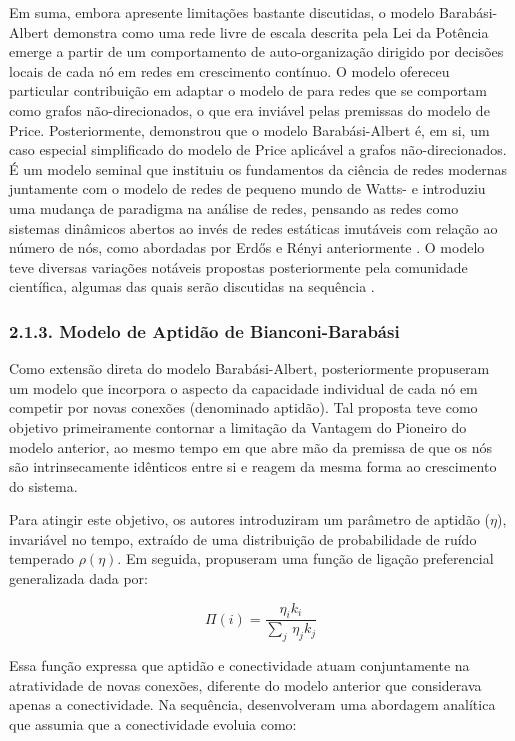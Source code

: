 \documentclass[12pt,oneside,a4paper,brazil,sumario=tradicional]{abntex2}
\begin{document}
Em suma, embora apresente limitações bastante discutidas, o modelo Barabási-Albert demonstra como uma rede livre de escala descrita pela Lei da Potência emerge a partir de um comportamento de auto-organização dirigido por decisões locais de cada nó em redes em crescimento contínuo. O modelo ofereceu particular contribuição em adaptar o modelo de \textcite{price1976} para redes que se comportam como grafos não-direcionados, o que era inviável pelas premissas do modelo de Price. Posteriormente, \textcite{newman2003} demonstrou que  o modelo Barabási-Albert é, em si, um caso especial simplificado do modelo de Price aplicável a grafos não-direcionados. É um modelo seminal que instituiu os fundamentos da ciência de redes modernas juntamente com o modelo de redes de pequeno mundo de Watts-\textcite{watts1998} e introduziu uma mudança de paradigma na análise de redes, pensando as redes como sistemas dinâmicos abertos ao invés de redes estáticas imutáveis com relação ao número de nós, como abordadas por Erdős e Rényi anteriormente \parencite{latora2017}. O modelo teve diversas variações notáveis propostas posteriormente pela comunidade científica, algumas das quais serão discutidas na sequência .

\subsubsection*{2.1.3. Modelo de Aptidão de Bianconi-Barabási}
Como extensão direta do modelo Barabási-Albert, posteriormente \textcite{bianconi2001} propuseram um modelo que incorpora o aspecto da capacidade individual de cada nó em competir por novas conexões (denominado aptidão). Tal proposta teve como objetivo primeiramente contornar a limitação da Vantagem do Pioneiro do modelo anterior, ao mesmo tempo em que abre mão da premissa de que os nós são intrinsecamente idênticos entre si e reagem da mesma forma ao crescimento do sistema.

Para atingir este objetivo, os autores introduziram um parâmetro de aptidão ($\eta$), invariável no tempo, extraído de uma distribuição de probabilidade de ruído temperado $\rho(\eta)$. Em seguida, propuseram uma função de ligação preferencial generalizada dada por:

\[\Pi(i) = \frac{\eta_{i}k_{i}}{\sum_{j}\,\eta_{j}k_{j}}\]

Essa função expressa que aptidão e conectividade atuam conjuntamente na atratividade de novas conexões, diferente do modelo anterior que considerava apenas a conectividade. Na sequência, desenvolveram uma abordagem analítica que assumia que a conectividade evoluia como:
\end{document}
